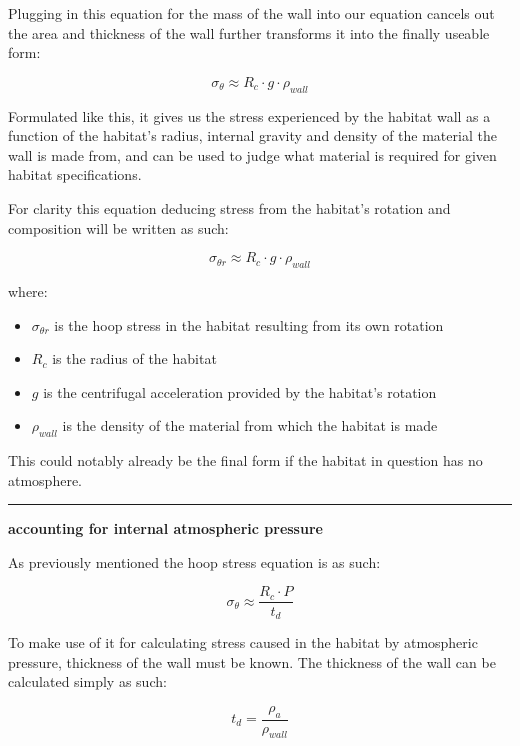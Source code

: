 \documentclass[a4paper]{article}
\begin{document}
	Plugging in this equation for the mass of the wall into our equation cancels out the area and thickness of the wall further transforms it into the finally useable form:
	
	$$ \sigma_\theta \approx R_c \cdot g \cdot \rho_{wall} $$
	
	Formulated like this, it gives us the stress experienced by the habitat wall as a function of the habitat's radius, internal gravity and density of the material the wall is made from, and can be used to judge what material is required for given habitat specifications.
	
	\pagebreak
	
	For clarity this equation deducing stress from the habitat's rotation and composition will be written as such:
	
	$$ \sigma_{\theta r} \approx R_c \cdot g \cdot \rho_{wall} $$
	
	where:
	
	\begin{itemize}
		\item $\sigma_{\theta r}$ is the hoop stress in the habitat resulting from its own rotation
		
		\item $R_c$ is the radius of the habitat
		
		\item $g$ is the centrifugal acceleration provided by the habitat's rotation
		
		\item $\rho_{wall}$ is the density of the material from which the habitat is made
	\end{itemize}
	
	This could notably already be the final form if the habitat in question has no atmosphere.
	
	\noindent \rule{\linewidth}{0.5pt}
	
	\begin{center}
		\textbf{accounting for internal atmospheric pressure}
	\end{center}
	
	As previously mentioned the hoop stress equation is as such:
	
	$$ \sigma_\theta \approx \frac{R_c \cdot P}{t_d} $$
	
	To make use of it for calculating stress caused in the habitat by atmospheric pressure, thickness of the wall must be known. The thickness of the wall can be calculated simply as such:
	
	$$ t_d = \frac{\rho_a}{\rho_{wall}} $$
	
\end{document}
